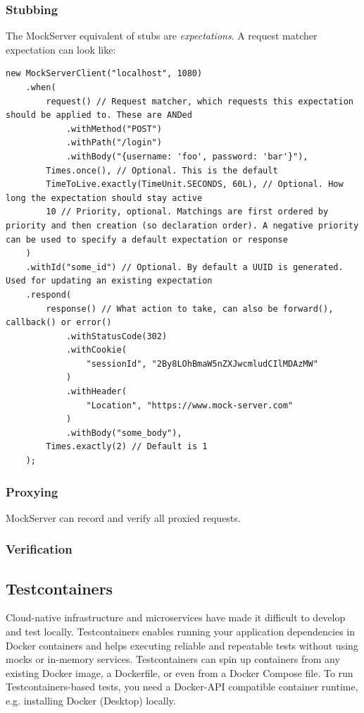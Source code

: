\documentclass[table, xcdraw]{article}%
\begin{document}
\subsubsection{Stubbing}

The MockServer equivalent of stubs are \emph{expectations}. A request matcher expectation can look like:

\begin{verbatim}
new MockServerClient("localhost", 1080)
    .when(
        request() // Request matcher, which requests this expectation should be applied to. These are ANDed
            .withMethod("POST")
            .withPath("/login")
            .withBody("{username: 'foo', password: 'bar'}"),
        Times.once(), // Optional. This is the default
        TimeToLive.exactly(TimeUnit.SECONDS, 60L), // Optional. How long the expectation should stay active
        10 // Priority, optional. Matchings are first ordered by priority and then creation (so declaration order). A negative priority can be used to specify a default expectation or response
    )
    .withId("some_id") // Optional. By default a UUID is generated. Used for updating an existing expectation
    .respond(
        response() // What action to take, can also be forward(), callback() or error()
            .withStatusCode(302)
            .withCookie(
                "sessionId", "2By8LOhBmaW5nZXJwcmludCIlMDAzMW"
            )
            .withHeader(
                "Location", "https://www.mock-server.com"
            )
            .withBody("some_body"),
        Times.exactly(2) // Default is 1
    );
\end{verbatim}

\subsubsection{Proxying}

MockServer can record and verify all proxied requests.

\subsubsection{Verification}

\subsection{Testcontainers}

Cloud-native infrastructure and microservices have made it difficult to develop and test locally. Testcontainers enables running your application dependencies in Docker containers and helps executing reliable and repeatable tests without using mocks or in-memory services. Testcontainers can spin up containers from any existing Docker image, a Dockerfile, or even from a Docker Compose file. To run Testcontainers-based tests, you need a Docker-API compatible container runtime, e.g. installing Docker (Desktop) locally.
\end{document}
